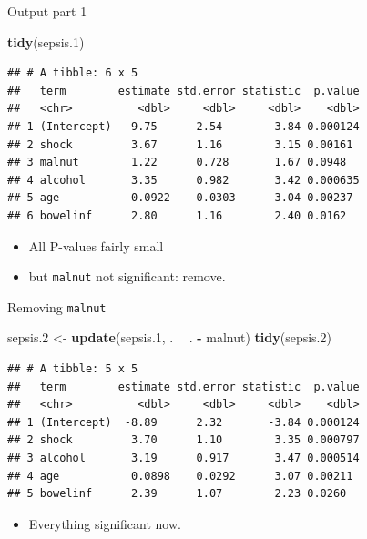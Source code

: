 \documentclass[ignorenonframetext,]{beamer}
\newenvironment{Shaded}{\begin{snugshade}}{\end{snugshade}}
\newcommand{\FloatTok}[1]{\textcolor[rgb]{0.00,0.00,0.81}{#1}}
\newcommand{\KeywordTok}[1]{\textcolor[rgb]{0.13,0.29,0.53}{\textbf{#1}}}
\newcommand{\NormalTok}[1]{#1}
\newcommand{\OperatorTok}[1]{\textcolor[rgb]{0.81,0.36,0.00}{\textbf{#1}}}
\newcommand{\StringTok}[1]{\textcolor[rgb]{0.31,0.60,0.02}{#1}}
\providecommand{\tightlist}{%
  \setlength{\itemsep}{0pt}\setlength{\parskip}{0pt}}
\begin{document}
\begin{frame}[fragile]{Output part 1}
\protect\hypertarget{output-part-1}{}

\begin{Shaded}
\begin{Highlighting}[]
\KeywordTok{tidy}\NormalTok{(sepsis}\FloatTok{.1}\NormalTok{)}
\end{Highlighting}
\end{Shaded}

\begin{verbatim}
## # A tibble: 6 x 5
##   term        estimate std.error statistic  p.value
##   <chr>          <dbl>     <dbl>     <dbl>    <dbl>
## 1 (Intercept)  -9.75      2.54       -3.84 0.000124
## 2 shock         3.67      1.16        3.15 0.00161 
## 3 malnut        1.22      0.728       1.67 0.0948  
## 4 alcohol       3.35      0.982       3.42 0.000635
## 5 age           0.0922    0.0303      3.04 0.00237 
## 6 bowelinf      2.80      1.16        2.40 0.0162
\end{verbatim}

\begin{itemize}
\item
  All P-values fairly small
\item
  but \texttt{malnut} not significant: remove.
\end{itemize}

\end{frame}

\begin{frame}[fragile]{Removing \texttt{malnut}}
\protect\hypertarget{removing-malnut}{}

\begin{Shaded}
\begin{Highlighting}[]
\NormalTok{sepsis}\FloatTok{.2}\NormalTok{ <-}\StringTok{ }\KeywordTok{update}\NormalTok{(sepsis}\FloatTok{.1}\NormalTok{, . }\OperatorTok{~}\StringTok{ }\NormalTok{. }\OperatorTok{-}\StringTok{ }\NormalTok{malnut)}
\KeywordTok{tidy}\NormalTok{(sepsis}\FloatTok{.2}\NormalTok{)}
\end{Highlighting}
\end{Shaded}

\begin{verbatim}
## # A tibble: 5 x 5
##   term        estimate std.error statistic  p.value
##   <chr>          <dbl>     <dbl>     <dbl>    <dbl>
## 1 (Intercept)  -8.89      2.32       -3.84 0.000124
## 2 shock         3.70      1.10        3.35 0.000797
## 3 alcohol       3.19      0.917       3.47 0.000514
## 4 age           0.0898    0.0292      3.07 0.00211 
## 5 bowelinf      2.39      1.07        2.23 0.0260
\end{verbatim}

\begin{itemize}
\tightlist
\item
  Everything significant now.
\end{itemize}

\end{frame}
\end{document}
